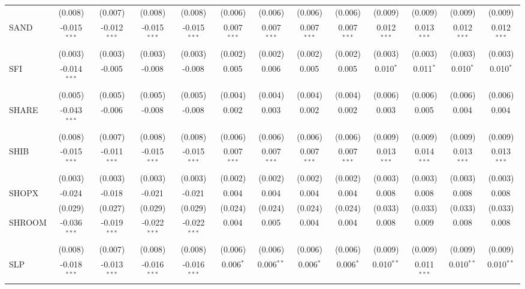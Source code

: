 \begin{table}[!htbp]
\begin{tabular}{@{\extracolsep{5pt}}lcccccccccccc}
  & (0.008) & (0.007) & (0.008) & (0.008) & (0.006) & (0.006) & (0.006) & (0.006) & (0.009) & (0.009) & (0.009) & (0.009) \\
 SAND & -0.015$^{***}$ & -0.012$^{***}$ & -0.015$^{***}$ & -0.015$^{***}$ & 0.007$^{***}$ & 0.007$^{***}$ & 0.007$^{***}$ & 0.007$^{***}$ & 0.012$^{***}$ & 0.013$^{***}$ & 0.012$^{***}$ & 0.012$^{***}$ \\
  & (0.003) & (0.003) & (0.003) & (0.003) & (0.002) & (0.002) & (0.002) & (0.002) & (0.003) & (0.003) & (0.003) & (0.003) \\
 SFI & -0.014$^{***}$ & -0.005$^{}$ & -0.008$^{}$ & -0.008$^{}$ & 0.005$^{}$ & 0.006$^{}$ & 0.005$^{}$ & 0.005$^{}$ & 0.010$^{*}$ & 0.011$^{*}$ & 0.010$^{*}$ & 0.010$^{*}$ \\
  & (0.005) & (0.005) & (0.005) & (0.005) & (0.004) & (0.004) & (0.004) & (0.004) & (0.006) & (0.006) & (0.006) & (0.006) \\
 SHARE & -0.043$^{***}$ & -0.006$^{}$ & -0.008$^{}$ & -0.008$^{}$ & 0.002$^{}$ & 0.003$^{}$ & 0.002$^{}$ & 0.002$^{}$ & 0.003$^{}$ & 0.005$^{}$ & 0.004$^{}$ & 0.004$^{}$ \\
  & (0.008) & (0.007) & (0.008) & (0.008) & (0.006) & (0.006) & (0.006) & (0.006) & (0.009) & (0.009) & (0.009) & (0.009) \\
 SHIB & -0.015$^{***}$ & -0.011$^{***}$ & -0.015$^{***}$ & -0.015$^{***}$ & 0.007$^{***}$ & 0.007$^{***}$ & 0.007$^{***}$ & 0.007$^{***}$ & 0.013$^{***}$ & 0.014$^{***}$ & 0.013$^{***}$ & 0.013$^{***}$ \\
  & (0.003) & (0.003) & (0.003) & (0.003) & (0.002) & (0.002) & (0.002) & (0.002) & (0.003) & (0.003) & (0.003) & (0.003) \\
 SHOPX & -0.024$^{}$ & -0.018$^{}$ & -0.021$^{}$ & -0.021$^{}$ & 0.004$^{}$ & 0.004$^{}$ & 0.004$^{}$ & 0.004$^{}$ & 0.008$^{}$ & 0.008$^{}$ & 0.008$^{}$ & 0.008$^{}$ \\
  & (0.029) & (0.027) & (0.029) & (0.029) & (0.024) & (0.024) & (0.024) & (0.024) & (0.033) & (0.033) & (0.033) & (0.033) \\
 SHROOM & -0.036$^{***}$ & -0.019$^{***}$ & -0.022$^{***}$ & -0.022$^{***}$ & 0.004$^{}$ & 0.005$^{}$ & 0.004$^{}$ & 0.004$^{}$ & 0.008$^{}$ & 0.009$^{}$ & 0.008$^{}$ & 0.008$^{}$ \\
  & (0.008) & (0.007) & (0.008) & (0.008) & (0.006) & (0.006) & (0.006) & (0.006) & (0.009) & (0.009) & (0.009) & (0.009) \\
 SLP & -0.018$^{***}$ & -0.013$^{***}$ & -0.016$^{***}$ & -0.016$^{***}$ & 0.006$^{*}$ & 0.006$^{**}$ & 0.006$^{*}$ & 0.006$^{*}$ & 0.010$^{**}$ & 0.011$^{***}$ & 0.010$^{**}$ & 0.010$^{**}$ \\

\end{tabular}
\end{table}
